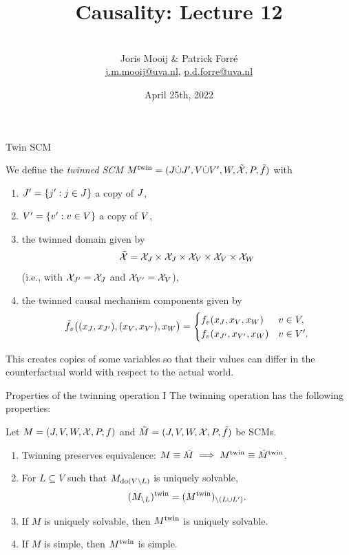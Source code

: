 \title[Causality]{Causality: Lecture 12}
\author[Joris Mooij]{\\[5mm]\large Joris Mooij \& Patrick Forr\'e\\
\url{j.m.mooij@uva.nl}, \url{p.d.forre@uva.nl}}
\date[2022-04-25]{\normalsize April 25th, 2022}
\maketitle

\begin{frame}{Twin SCM}
\begin{definition}
  We define the \emph{twinned SCM} $M^{\mathrm{twin}} = ( J \dot\cup J', V \dot\cup V', W, \tilde{\mathcal{X}}, P, \tilde{f} )$
  with 
  \begin{enumerate}
    \item $J' = \{j' : j \in J\}$ a copy of $J$,
    \item $V' = \{v' : v \in V\}$ a copy of $V$, 
    \item the twinned domain given by
  $$\tilde{\mathcal{X}} = \mathcal{X}_{J} \times \mathcal{X}_{J} \times \mathcal{X}_{V} \times \mathcal{X}_{V} \times \mathcal{X}_{W}$$
  (i.e., with $\mathcal{X}_{J'} = \mathcal{X}_{J}$ and $\mathcal{X}_{V'} = \mathcal{X}_{V}$),
    \item the twinned causal mechanism components given by
  $$\tilde{f}_v\big((x_J,x_{J'}),(x_V,x_{V'}),x_{W}\big) = 
  \begin{cases}
    f_v(x_{J},x_{V},x_{W}) & v \in V,  \\
    f_v(x_{J'},x_{V'},x_{W}) & v \in V'.
  \end{cases}$$
  \end{enumerate}
\end{definition}
  This creates copies of some variables so that their values can differ in the counterfactual world with respect to the actual world.
\end{frame}

\begin{frame}{Properties of the twinning operation I}
The twinning operation has the following properties:
\begin{Prp}
Let $M = \left ( J, V, W, \mathcal{X}, P, f \right )$ and $\tilde{M} = ( J, V, W, \mathcal{X}, P, \tilde{f} )$ be SCMs.
  \begin{enumerate}
\item Twinning preserves equivalence: $M \equiv \tilde{M} \implies M^{\mathrm{twin}} \equiv \tilde{M}^{\mathrm{twin}}$.
\item 
For $L \subseteq V$ such that $M_{\operatorname{do}(V\setminus L)}$ is uniquely solvable,
$$(M_{\setminus L})^{\mathrm{twin}} = (M^{\mathrm{twin}})_{\setminus (L\cup L')}.$$
\item If $M$ is uniquely solvable, then $M^{\mathrm{twin}}$ is uniquely solvable.
\item If $M$ is simple, then $M^{\mathrm{twin}}$ is simple.
\end{enumerate}
\end{Prp}
\end{frame}

